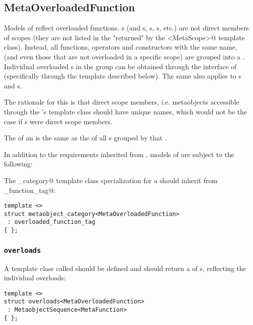 \subsection{MetaOverloadedFunction}
\label{concept-MetaOverloadedFunction}

Models of  reflect overloaded functions.
s (and s, s, s, etc.)
are not direct members of scopes (they are not listed in the 
"returned" by the \verb@members<MetaScope>@ template class).
Instead, all functions, operators and constructors with the same name, (and even those that are not
overloaded in a specific scope) are grouped into a . Individual overloaded s
in the group can be obtained through the interface of  (specifically through the
\verb@overloads@ template described below). The same also applies to s and s.

The rationale for this is that direct scope members, i.e. metaobjects accessible through the 's
\verb@members@ template class should have unique names, which would not be the case if s
were direct scope members.

The \verb@scope@ of an  is the same as the \verb@scope@
of all s grouped by that .

In addition to the requirements inherited from ,
models of  are subject to the following:

The \verb@metaobject_category@ template class specialization for a 
should inherit from \verb@overloaded_function_tag@:

\begin{verbatim}
template <>
struct metaobject_category<MetaOverloadedFunction>
 : overloaded_function_tag
{ };
\end{verbatim}

\subsubsection{\texttt{overloads}}

A template class called \verb@overloads@ should be defined and should
return a  of s, reflecting
the individual overloads:

\begin{verbatim}
template <>
struct overloads<MetaOverloadedFunction>
 : MetaobjectSequence<MetaFunction>
{ };
\end{verbatim}

